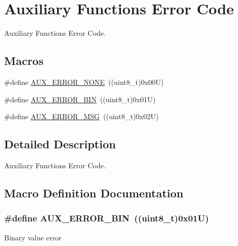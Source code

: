 \hypertarget{group___k_n_x___aux___error___code}{}\section{Auxiliary Functions\textquotesingle{} Error Code}
\label{group___k_n_x___aux___error___code}


Auxiliary Functions\textquotesingle{} Error Code.  


\subsection*{Macros}
\begin{DoxyCompactItemize}
\item 
\#define \hyperlink{group___k_n_x___aux___error___code_ga1e08e2873ccb2fb0f45f8e02c05c5733}{A\+U\+X\+\_\+\+E\+R\+R\+O\+R\+\_\+\+N\+O\+NE}~((uint8\+\_\+t)0x00\+U)
\item 
\#define \hyperlink{group___k_n_x___aux___error___code_ga9197dfa3db0d3058a682575b0122e971}{A\+U\+X\+\_\+\+E\+R\+R\+O\+R\+\_\+\+B\+IN}~((uint8\+\_\+t)0x01\+U)
\item 
\#define \hyperlink{group___k_n_x___aux___error___code_ga8e01b81bddb576a48d989c7ba75b7cc7}{A\+U\+X\+\_\+\+E\+R\+R\+O\+R\+\_\+\+M\+SG}~((uint8\+\_\+t)0x02\+U)
\end{DoxyCompactItemize}


\subsection{Detailed Description}
Auxiliary Functions\textquotesingle{} Error Code. 



\subsection{Macro Definition Documentation}
\subsubsection[{\texorpdfstring{A\+U\+X\+\_\+\+E\+R\+R\+O\+R\+\_\+\+B\+IN}{AUX_ERROR_BIN}}]{\setlength{\rightskip}{0pt plus 5cm}\#define A\+U\+X\+\_\+\+E\+R\+R\+O\+R\+\_\+\+B\+IN~((uint8\+\_\+t)0x01\+U)}\hypertarget{group___k_n_x___aux___error___code_ga9197dfa3db0d3058a682575b0122e971}{}\label{group___k_n_x___aux___error___code_ga9197dfa3db0d3058a682575b0122e971}
Binary value error 
